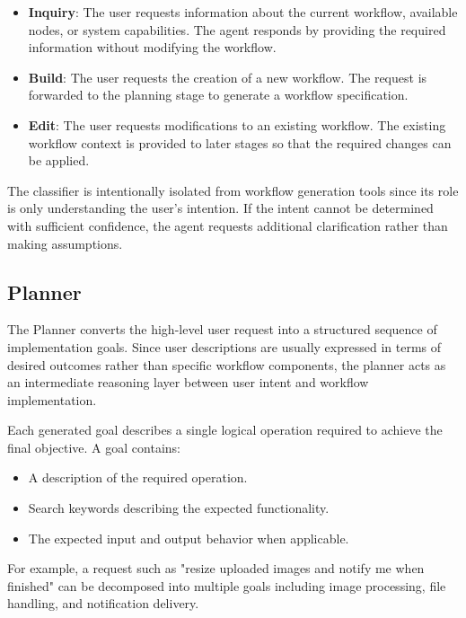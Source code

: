 \begin{itemize}
    \item \textbf{Inquiry}: The user requests information about the current workflow, available nodes, or system capabilities. The agent responds by providing the required information without modifying the workflow.
    
    \item \textbf{Build}: The user requests the creation of a new workflow. The request is forwarded to the planning stage to generate a workflow specification.
    
    \item \textbf{Edit}: The user requests modifications to an existing workflow. The existing workflow context is provided to later stages so that the required changes can be applied.
\end{itemize}

The classifier is intentionally isolated from workflow generation tools since its role is only understanding the user's intention. If the intent cannot be determined with sufficient confidence, the agent requests additional clarification rather than making assumptions.

\subsection{Planner}

The Planner converts the high-level user request into a structured sequence of implementation goals. Since user descriptions are usually expressed in terms of desired outcomes rather than specific workflow components, the planner acts as an intermediate reasoning layer between user intent and workflow implementation.

Each generated goal describes a single logical operation required to achieve the final objective. A goal contains:

\begin{itemize}
    \item A description of the required operation.
    \item Search keywords describing the expected functionality.
    \item The expected input and output behavior when applicable.
\end{itemize}

For example, a request such as "resize uploaded images and notify me when finished" can be decomposed into multiple goals including image processing, file handling, and notification delivery.

